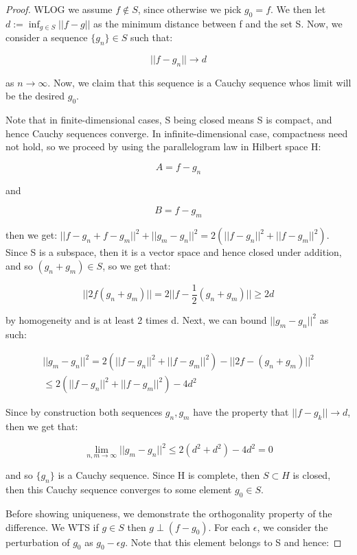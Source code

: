\documentclass[class=article, crop=false]{standalone}
\begin{document}
		\begin{proof}
			WLOG we assume $f \notin S$, since otherwise we pick $g_0 = f$. We then let $d := \inf_{g\in S} ||f -g||$ as the minimum distance between f and the set S. Now, we consider a sequence $\{g_n\} \in S$ such that:

				$$||f - g_n|| \rightarrow d$$

			as $n \rightarrow \infty$. Now, we claim that this sequence is a Cauchy sequence whos limit will be the desired $g_0$. 

			Note that in finite-dimensional cases, S being closed means S is compact, and hence Cauchy sequences converge. In infinite-dimensional case, compactness need not hold, so we proceed by using the parallelogram law in Hilbert space H:

				$$A = f - g_n$$

			and 

				$$B = f - g_m$$

			then we get: $||f - g_n + f - g_m||^2 + ||g_m - g_n||^2 = 2(||f-g_n||^2 + ||f-g_m||^2)$. Since S is a subspace, then it is a vector space and hence closed under addition, and so $(g_n + g_m) \in S$, so we get that:

				$$||2f(g_n+g_m)|| = 2||f - \frac{1}{2} (g_n + g_m)|| \ge 2d$$

			by homogeneity and is at least 2 times d. Next, we can bound $||g_m - g_n||^2$ as such:

			\begin{align}
				||g_m - g_n||^2 = 2(||f - g_n||^2 + ||f - g_m||^2) - ||2f - (g_n + g_m)||^2 \\
				\le 2(||f - g_n||^2 + ||f - g_m||^2) - 4d^2 
			\end{align}

			Since by construction both sequences $g_n, g_m$ have the property that $||f - g_k|| \rightarrow d$, then we get that:

				$$\lim_{n,m\rightarrow \infty}||g_m - g_n||^2 \le 2(d^2+d^2) - 4d^2 = 0$$

			and so $\{g_n\}$ is a Cauchy sequence. Since H is complete, then $S \subset H$ is closed, then this Cauchy sequence converges to some element $g_0 \in S$.

			Before showing uniqueness, we demonstrate the orthogonality property of the difference. We WTS if $g \in S$ then $g \perp (f - g_0)$. For each $\epsilon$, we consider the perturbation of $g_0$ as $g_0 - \epsilon g$. Note that this element belongs to S and hence:


\end{proof}
\end{document}
